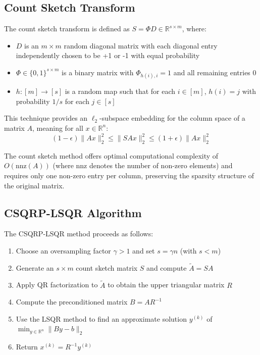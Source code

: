 \documentclass[11pt]{article}
\begin{document}
\subsection{Count Sketch Transform}

The count sketch transform is defined as $S = \Phi D \in \mathbb{R}^{s \times m}$, where:
\begin{itemize}
    \item $D$ is an $m \times m$ random diagonal matrix with each diagonal entry independently chosen to be +1 or -1 with equal probability
    \item $\Phi \in \{0,1\}^{s \times m}$ is a binary matrix with $\Phi_{h(i),i} = 1$ and all remaining entries 0
    \item $h: [m] \rightarrow [s]$ is a random map such that for each $i \in [m]$, $h(i) = j$ with probability $1/s$ for each $j \in [s]$
\end{itemize}

This technique provides an $\ell_2$-subspace embedding for the column space of a matrix $A$, meaning for all $x \in \mathbb{R}^n$:
\begin{equation}
(1-\epsilon)\|Ax\|^2_2 \leq \|SAx\|^2_2 \leq (1+\epsilon)\|Ax\|^2_2
\end{equation}

The count sketch method offers optimal computational complexity of $O(\text{nnz}(A))$ (where nnz denotes the number of non-zero elements) and requires only one non-zero entry per column, preserving the sparsity structure of the original matrix.

\subsection{CSQRP-LSQR Algorithm}

The CSQRP-LSQR method proceeds as follows:

\begin{enumerate}
    \item Choose an oversampling factor $\gamma > 1$ and set $s = \gamma n$ (with $s < m$)
    \item Generate an $s \times m$ count sketch matrix $S$ and compute $\tilde{A} = SA$
    \item Apply QR factorization to $\tilde{A}$ to obtain the upper triangular matrix $R$
    \item Compute the preconditioned matrix $B = AR^{-1}$
    \item Use the LSQR method to find an approximate solution $y^{(k)}$ of $\min_{y \in \mathbb{R}^n} \|By - b\|_2$
    \item Return $x^{(k)} = R^{-1}y^{(k)}$
\end{enumerate}
\end{document}
